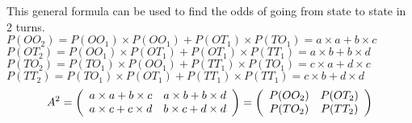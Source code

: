 This general formula can be used to find the odds of going from state to state in 2 turns.\\
$P(OO_2) = P(OO_1) \times P(OO_1)+P(OT_1) \times P(TO_1) = a \times a + b \times c$\\
$P(OT_2) = P(OO_1) \times P(OT_1)+P(OT_1) \times P(TT_1) = a \times b + b \times d$\\
$P(TO_2) = P(TO_1) \times P(OO_1)+P(TT_1) \times P(TO_1) = c \times a + d \times c$\\
$P(TT_2) = P(TO_1) \times P(OT_1)+P(TT_1) \times P(TT_1) = c \times b + d \times d$
\[
A^2 =
\left(
\begin{array}{c c}
a \times a+b \times c & a \times b+b \times d \\
a \times c+c \times d & b \times c+d \times d \\
\end{array}
\right)
=
\left(
\begin{array}{c c}
P(OO_2) & P(OT_2) \\
P(TO_2) & P(TT_2) \\
\end{array}
\right) \]


